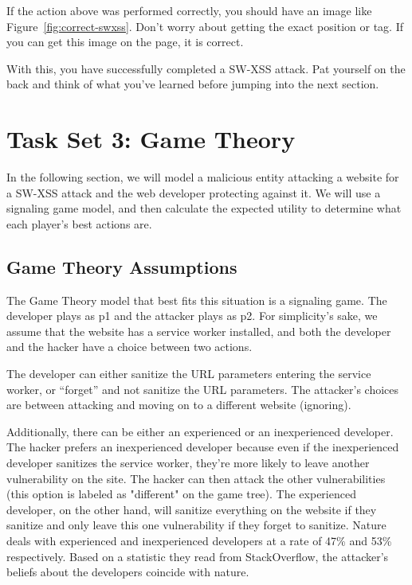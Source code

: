 \documentclass[letterpaper,12pt]{report}
\newcounter{taskset}
\newcounter{action}[taskset]
\begin{document}
If the action above was performed correctly, you should have an image like Figure~\ref{fig:correct-swxss}. Don't worry about getting the exact position or tag. If you can get this image on the page, it is correct. 

With this, you have successfully completed a SW-XSS attack. Pat yourself on the back and think of what you've learned before jumping into the next section.

\section*{Task Set 3: Game Theory}\label{sec:GameTheory}

In the following section, we will model a malicious entity attacking a website for a SW-XSS attack and the web developer protecting against it. We will use a signaling game model, and then calculate the expected utility to determine what each player’s best actions are.

\subsection*{Game Theory Assumptions}

The Game Theory model that best fits this situation is a signaling game. The developer plays as p1 and the attacker plays as p2. For simplicity’s sake, we assume that the website has a service worker installed, and both the developer and the hacker have a choice between two actions.

The developer can either sanitize the URL parameters entering the service worker, or ``forget” and not sanitize the URL parameters. The attacker’s choices are between attacking and moving on to a different website (ignoring).

Additionally, there can be either an experienced or an inexperienced developer. The hacker prefers an inexperienced developer because even if the inexperienced developer sanitizes the service worker, they're more likely to leave another vulnerability on the site. The hacker can then attack the other vulnerabilities (this option is labeled as "different" on the game tree). The experienced developer, on the other hand, will sanitize everything on the website if they sanitize and only leave this one vulnerability if they forget to sanitize. Nature deals with experienced and inexperienced developers at a rate of 47\% and 53\% respectively. Based on a statistic they read from StackOverflow, the attacker’s beliefs about the developers coincide with nature.
\end{document}
